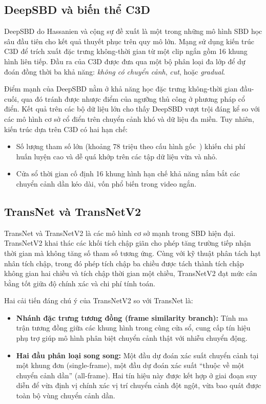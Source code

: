 \subsection{DeepSBD và biến thể C3D}
DeepSBD do Hassanien và cộng sự đề xuất \cite{hassanien2017largescale} là một trong những mô hình SBD học sâu đầu tiên cho kết quả thuyết phục trên quy mô lớn. Mạng sử dụng kiến trúc C3D \cite{tran2015c3d} để trích xuất đặc trưng không-thời gian từ một clip ngắn gồm 16 khung hình liên tiếp. Đầu ra của C3D được đưa qua một bộ phân loại đa lớp để dự đoán đồng thời ba khả năng: \textit{không có chuyển cảnh}, \textit{cut}, hoặc \textit{gradual}.

Điểm mạnh của DeepSBD nằm ở khả năng học đặc trưng không-thời gian đầu-cuối, qua đó tránh được nhược điểm của ngưỡng thủ công ở phương pháp cổ điển. Kết quả trên các bộ dữ liệu lớn cho thấy DeepSBD vượt trội đáng kể so với các mô hình cơ sở cổ điển trên chuyển cảnh khó và dữ liệu đa miền. Tuy nhiên, kiến trúc dựa trên C3D có hai hạn chế:
\begin{itemize}
    \item Số lượng tham số lớn (khoảng 78 triệu theo cấu hình gốc~\cite{tran2015c3d}) khiến chi phí huấn luyện cao và dễ quá khớp trên các tập dữ liệu vừa và nhỏ.
    \item Cửa sổ thời gian cố định 16 khung hình hạn chế khả năng nắm bắt các chuyển cảnh dần kéo dài, vốn phổ biến trong video ngắn.
\end{itemize}

\subsection{TransNet và TransNetV2}
TransNet \cite{soucek2019transnet} và TransNetV2 \cite{soucek2020transnetv2} là các mô hình cơ sở mạnh trong SBD hiện đại. TransNetV2 khai thác các khối tích chập giãn cho phép tăng trường tiếp nhận thời gian mà không tăng số tham số tương ứng. Cùng với kỹ thuật phân tách hạt nhân tích chập, trong đó phép tích chập ba chiều được tách thành tích chập không gian hai chiều và tích chập thời gian một chiều, TransNetV2 đạt mức cân bằng tốt giữa độ chính xác và chi phí tính toán.

Hai cải tiến đáng chú ý của TransNetV2 so với TransNet là:
\begin{itemize}
    \item \textbf{Nhánh đặc trưng tương đồng (frame similarity branch):} Tính ma trận tương đồng giữa các khung hình trong cùng cửa sổ, cung cấp tín hiệu phụ trợ giúp mô hình phân biệt chuyển cảnh thật với nhiễu chuyển động.
    \item \textbf{Hai đầu phân loại song song:} Một đầu dự đoán xác suất chuyển cảnh tại một khung đơn (single-frame), một đầu dự đoán xác suất ``thuộc về một chuyển cảnh dần'' (all-frame). Hai tín hiệu này được kết hợp ở giai đoạn suy diễn để vừa định vị chính xác vị trí chuyển cảnh đột ngột, vừa bao quát được toàn bộ vùng chuyển cảnh dần.
\end{itemize}

